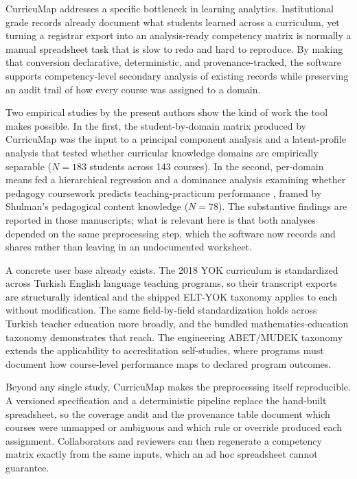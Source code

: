 \documentclass[11pt]{article}
\begin{document}
CurricuMap addresses a specific bottleneck in learning analytics. Institutional grade records already document what students learned across a curriculum, yet turning a registrar export into an analysis-ready competency matrix is normally a manual spreadsheet task that is slow to redo and hard to reproduce. By making that conversion declarative, deterministic, and provenance-tracked, the software supports competency-level secondary analysis of existing records while preserving an audit trail of how every course was assigned to a domain.

Two empirical studies by the present authors show the kind of work the tool makes possible. In the first, the student-by-domain matrix produced by CurricuMap was the input to a principal component analysis and a latent-profile analysis that tested whether curricular knowledge domains are empirically separable \cite{can2025a} ($N=183$ students across 143 courses). In the second, per-domain means fed a hierarchical regression and a dominance analysis examining whether pedagogy coursework predicts teaching-practicum performance \cite{can2025b}, framed by Shulman's pedagogical content knowledge \cite{shulman1986} ($N=78$). The substantive findings are reported in those manuscripts; what is relevant here is that both analyses depended on the same preprocessing step, which the software now records and shares rather than leaving in an undocumented worksheet.

A concrete user base already exists. The 2018 YOK curriculum \cite{yok2018} is standardized across Turkish English language teaching programs, so their transcript exports are structurally identical and the shipped ELT-YOK taxonomy applies to each without modification. The same field-by-field standardization holds across Turkish teacher education more broadly, and the bundled mathematics-education taxonomy demonstrates that reach. The engineering ABET/MUDEK taxonomy extends the applicability to accreditation self-studies, where programs must document how course-level performance maps to declared program outcomes.

Beyond any single study, CurricuMap makes the preprocessing itself reproducible. A versioned specification and a deterministic pipeline replace the hand-built spreadsheet, so the coverage audit and the provenance table document which courses were unmapped or ambiguous and which rule or override produced each assignment. Collaborators and reviewers can then regenerate a competency matrix exactly from the same inputs, which an ad hoc spreadsheet cannot guarantee.
\end{document}
